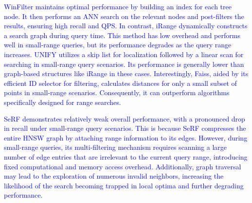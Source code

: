 \documentclass[sigconf, nonacm]{acmart}
\begin{document}
{	\textcolor{blue}{
	WinFilter maintains optimal performance by building an index for each tree node. It then performs an ANN search on the relevant nodes and post-filters the results, ensuring high recall and QPS.
	In contrast, iRange dynamically constructs a search graph during query time. This method has low overhead and performs well in small-range queries, but its performance degrades as the query range increases.
	UNIFY utilizes a skip list for localization followed by a linear scan for searching in small-range query scenarios. Its performance is generally lower than graph-based structures like iRange in these cases.
	Interestingly, Faiss, aided by its efficient ID selector for filtering, calculates distances for only a small subset of points in small-range scenarios. Consequently, it can outperform algorithms specifically designed for range searches.
	}
%	
	

	\textcolor{blue}{SeRF demonstrates relatively weak overall performance, with a pronounced drop in recall under small-range query scenarios. This is because SeRF compresses the entire HNSW graph by attaching range information to its edges. However, during small-range queries, its multi-filtering mechanism requires scanning a large number of edge entries that are irrelevant to the current query range, introducing fixed computational and memory access overhead. Additionally, graph traversal may lead to the exploration of numerous invalid neighbors, increasing the likelihood of the search becoming trapped in local optima and further degrading performance.
	}
	
}
\end{document}
